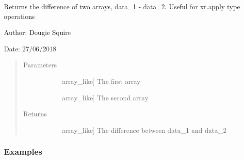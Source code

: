 \documentclass[letterpaper,10pt,english]{sphinxmanual}
\begin{document}
\begin{fulllineitems}
\label{\detokenize{utils_doc:utils.subtract}}
Returns the difference of two arrays, data\_1 - data\_2. Useful for xr.apply type operations

\begin{DUlineblock}{0em}
\item[] Author: Dougie Squire
\item[] Date: 27/06/2018
\end{DUlineblock}
\begin{quote}\begin{description}
\item[{Parameters}] \leavevmode\begin{description}
\item[{}] \leavevmode{[}array\_like{]}
The first array

\item[{}] \leavevmode{[}array\_like{]}
The second array

\end{description}

\item[{Returns}] \leavevmode\begin{description}
\item[{}] \leavevmode{[}array\_like{]}
The difference between data\_1 and data\_2

\end{description}

\end{description}\end{quote}
\subsubsection*{Examples}


\end{fulllineitems}
\end{document}
